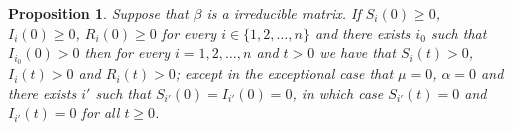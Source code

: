 \documentclass[a4paper,10pt]{article}
\newtheorem{prop}[thm]{Proposition}
\theoremstyle{remark}
\begin{document}


  
  








 

\begin{prop} Suppose that $\beta$ is a irreducible matrix. If $S_i(0)\geq 0$, $I_i(0)\geq 0$, $R_i(0)\geq 0$ for every $i\in\{1,2,\ldots,n\}$ and there exists $i_0$ such that $I_{i_0}(0)>0$ then for every $i=1,2,\ldots,n$ and $t>0$ we have that $S_i(t)>0$, $I_i(t)>0$ and $R_i(t)>0$; except in the exceptional case that  $\mu=0$, $\alpha=0$ and  there exists $i'$ such that $S_{i'}(0)=I_{i'}(0)=0$, in which case  
$S_{i'}(t)=0$ and $I_{i'}(t)=0$ for all $t\geq 0$.
\end{prop}
 
\end{document}

